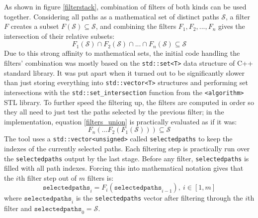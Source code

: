 As shown in figure \ref{filterstack}, combination of filters of both kinds can be used together. Considering all paths as a mathematical set of distinct paths $\mathcal{S}$, a filter $F$ creates a subset $F(\mathcal{S}) \subseteq \mathcal{S}$, and combining the filters $F_1, F_2, ..., F_n$ gives the intersection of their relative subsets:
\begin{equation}
	\label{filters_union}
	F_1(\mathcal{S}) \cap F_2(\mathcal{S}) \cap ... \cap F_n(\mathcal{S}) \subseteq \mathcal{S}
\end{equation}
Due to this strong affinity to mathematical sets, the initial code handling the filters' combination was mostly based on the \texttt{std::set<T>} data structure of C++ standard library. It was put apart when it turned out to be significantly slower than just storing everything into \texttt{std::vector<T>} structures and performing set intersections with the \texttt{std::set\_intersection} function from the \texttt{<algorithm>} STL library. To further speed the filtering up, the filters are computed in order so they all need to just test the paths selected by the previous filter; in the implementation, equation \ref{filters_union} is practically evaluated as if it was:
\begin{equation}
	F_n( ... F_2(F_1(\mathcal{S}))) \subseteq \mathcal{S}
\end{equation}
The tool uses a \texttt{std::vector<unsigned>} called \texttt{selectedpaths} to keep the indexes of the currently selected paths. Each filtering step is practically run over the \texttt{selectedpaths} output by the last stage. Before any filter, \texttt{selectedpaths} is filled with all path indexes. Forcing this into mathematical notation gives that the $i$th filter step out of $m$ filters is:
\begin{equation}
	\texttt{selectedpaths}_i = F_i(\texttt{selectedpaths}_{i-1}),\ i\in[1, m]
\end{equation}
where $\texttt{selectedpaths}_i$ is the \texttt{selectedpaths} vector after filtering through the $i$th filter and $\texttt{selectedpaths}_0 = \mathcal{S}$.


